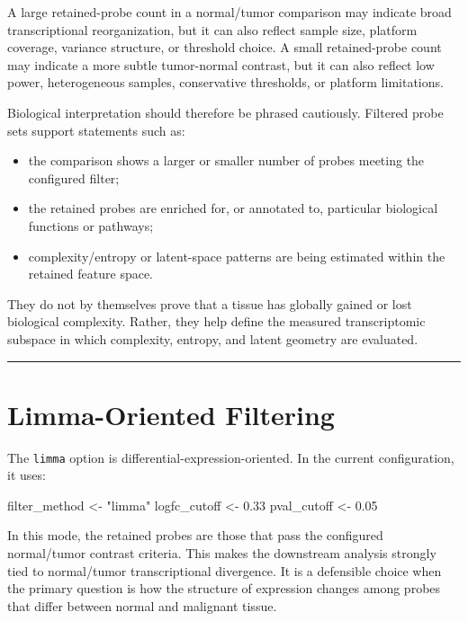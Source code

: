 \documentclass[
  letterpaper,
  DIV=11,
  numbers=noendperiod,
  openany,
  oneside]{scrreprt}
\newenvironment{Shaded}{\begin{snugshade}}{\end{snugshade}}
\newcommand{\FloatTok}[1]{\textcolor[rgb]{0.68,0.00,0.00}{#1}}
\newcommand{\NormalTok}[1]{\textcolor[rgb]{0.00,0.23,0.31}{#1}}
\newcommand{\OtherTok}[1]{\textcolor[rgb]{0.00,0.23,0.31}{#1}}
\newcommand{\StringTok}[1]{\textcolor[rgb]{0.13,0.47,0.30}{#1}}
\providecommand{\tightlist}{%
  \setlength{\itemsep}{0pt}\setlength{\parskip}{0pt}}
\begin{document}
A large retained-probe count in a normal/tumor comparison may indicate
broad transcriptional reorganization, but it can also reflect sample
size, platform coverage, variance structure, or threshold choice. A
small retained-probe count may indicate a more subtle tumor-normal
contrast, but it can also reflect low power, heterogeneous samples,
conservative thresholds, or platform limitations.

Biological interpretation should therefore be phrased cautiously.
Filtered probe sets support statements such as:

\begin{itemize}
\tightlist
\item
  the comparison shows a larger or smaller number of probes meeting the
  configured filter;
\item
  the retained probes are enriched for, or annotated to, particular
  biological functions or pathways;
\item
  complexity/entropy or latent-space patterns are being estimated within
  the retained feature space.
\end{itemize}

They do not by themselves prove that a tissue has globally gained or
lost biological complexity. Rather, they help define the measured
transcriptomic subspace in which complexity, entropy, and latent
geometry are evaluated.

\begin{center}\rule{0.5\linewidth}{0.5pt}\end{center}

\section{Limma-Oriented Filtering}\label{limma-oriented-filtering}

The \texttt{limma} option is differential-expression-oriented. In the
current configuration, it uses:

\begin{Shaded}
\begin{Highlighting}[]
\NormalTok{filter\_method }\OtherTok{\textless{}{-}} \StringTok{"limma"}
\NormalTok{logfc\_cutoff  }\OtherTok{\textless{}{-}} \FloatTok{0.33}
\NormalTok{pval\_cutoff   }\OtherTok{\textless{}{-}} \FloatTok{0.05}
\end{Highlighting}
\end{Shaded}

In this mode, the retained probes are those that pass the configured
normal/tumor contrast criteria. This makes the downstream analysis
strongly tied to normal/tumor transcriptional divergence. It is a
defensible choice when the primary question is how the structure of
expression changes among probes that differ between normal and malignant
tissue.
\end{document}
